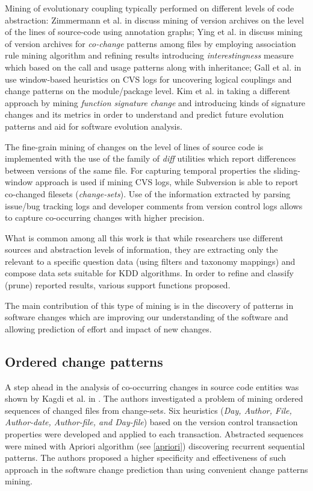 Mining of evolutionary coupling typically performed on different levels of code abstraction: Zimmermann et al. in \cite{citeulike:4406375} discuss mining of version archives on the level of the lines of source-code using annotation graphs; Ying et al. in \cite{citeulike:983796} discuss mining of version archives for \textit{co-change} patterns among files by employing association rule mining algorithm and refining results introducing \textit{interestingness} measure which based on the call and usage patterns along with inheritance; Gall et al. in \cite{citeulike:5397994} use window-based heuristics on CVS logs for uncovering logical couplings and change patterns on the module/package level. Kim et al. in \cite{citeulike:5375867} taking a different approach by mining \textit{function signature change} and introducing kinds of signature changes and its metrics in order to understand and predict future evolution patterns and aid for software evolution analysis.

The fine-grain mining of changes on the level of lines of source code is implemented with the use of the family of \textit{diff} utilities which report differences between versions of the same file. For capturing temporal properties the sliding-window approach is used if mining CVS logs, while Subversion is able to report co-changed filesets (\textit{change-sets}). Use of the information extracted by parsing issue/bug tracking logs and developer comments from version control logs allows to capture co-occurring changes with higher precision.

What is common among all this work is that while researchers use different sources and abstraction levels of information, they are extracting only the relevant to a specific question data (using filters and taxonomy mappings) and compose data sets suitable for KDD algorithms. In order to refine and classify (prune) reported results, various support functions proposed.

The main contribution of this type of mining is in the discovery of patterns in software changes which are improving our  understanding of the software and allowing prediction of effort and impact of new changes.

\subsection{Ordered change patterns}
A step ahead in the analysis of co-occurring changes in source code entities was shown by Kagdi et al. in \cite{citeulike:3929070}. The authors investigated a problem of mining ordered sequences of changed files from change-sets. Six heuristics (\textit{Day, Author, File, Author-date, Author-file, and Day-file}) based on the version control transaction properties were developed and applied to each transaction. Abstracted sequences were mined with Apriori algorithm (see \ref{apriori}) discovering recurrent sequential patterns. The authors proposed a higher specificity and effectiveness of such approach in the software change prediction than using convenient change patterns mining.

